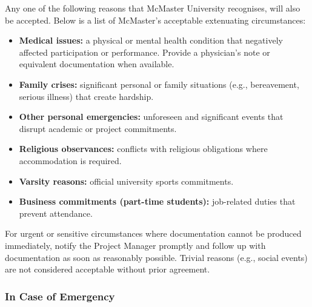 \documentclass{article}
\begin{document}
Any one of the following reasons that McMaster University recognises, will also be accepted. Below is a list of McMaster's acceptable extenuating circumstances:

\begin{itemize}
  \item \textbf{Medical issues:} a physical or mental health condition that negatively affected participation or performance. Provide a physician's note or equivalent documentation when available.
  \item \textbf{Family crises:} significant personal or family situations (e.g., bereavement, serious illness) that create hardship.
  \item \textbf{Other personal emergencies:} unforeseen and significant events that disrupt academic or project commitments.
  \item \textbf{Religious observances:} conflicts with religious obligations where accommodation is required.
  \item \textbf{Varsity reasons:} official university sports commitments.
  \item \textbf{Business commitments (part-time students):} job-related duties that prevent attendance.
\end{itemize}

For urgent or sensitive circumstances where documentation cannot be produced immediately, notify the Project Manager promptly and follow up with documentation as soon as reasonably possible. Trivial reasons (e.g., social events) are not considered acceptable without prior agreement.

\subsubsection*{In Case of Emergency}
\end{document}
